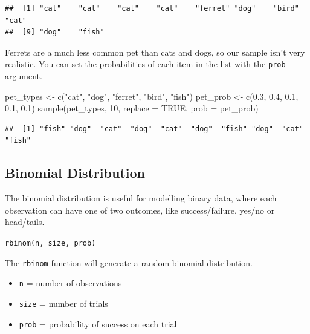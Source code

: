 \documentclass[
  oneside]{book}
\newenvironment{Shaded}{\begin{snugshade}}{\end{snugshade}}
\newcommand{\AttributeTok}[1]{\textcolor[rgb]{0.77,0.63,0.00}{#1}}
\newcommand{\ConstantTok}[1]{\textcolor[rgb]{0.00,0.00,0.00}{#1}}
\newcommand{\DecValTok}[1]{\textcolor[rgb]{0.00,0.00,0.81}{#1}}
\newcommand{\FloatTok}[1]{\textcolor[rgb]{0.00,0.00,0.81}{#1}}
\newcommand{\FunctionTok}[1]{\textcolor[rgb]{0.00,0.00,0.00}{#1}}
\newcommand{\NormalTok}[1]{#1}
\newcommand{\OtherTok}[1]{\textcolor[rgb]{0.56,0.35,0.01}{#1}}
\newcommand{\StringTok}[1]{\textcolor[rgb]{0.31,0.60,0.02}{#1}}
\providecommand{\tightlist}{%
  \setlength{\itemsep}{0pt}\setlength{\parskip}{0pt}}
\begin{document}
\begin{verbatim}
##  [1] "cat"    "cat"    "cat"    "cat"    "ferret" "dog"    "bird"   "cat"   
##  [9] "dog"    "fish"
\end{verbatim}

Ferrets are a much less common pet than cats and dogs, so our sample isn't very realistic. You can set the probabilities of each item in the list with the \texttt{prob} argument.

\begin{Shaded}
\begin{Highlighting}[]
\NormalTok{pet\_types }\OtherTok{\textless{}{-}} \FunctionTok{c}\NormalTok{(}\StringTok{"cat"}\NormalTok{, }\StringTok{"dog"}\NormalTok{, }\StringTok{"ferret"}\NormalTok{, }\StringTok{"bird"}\NormalTok{, }\StringTok{"fish"}\NormalTok{)}
\NormalTok{pet\_prob }\OtherTok{\textless{}{-}} \FunctionTok{c}\NormalTok{(}\FloatTok{0.3}\NormalTok{, }\FloatTok{0.4}\NormalTok{, }\FloatTok{0.1}\NormalTok{, }\FloatTok{0.1}\NormalTok{, }\FloatTok{0.1}\NormalTok{)}
\FunctionTok{sample}\NormalTok{(pet\_types, }\DecValTok{10}\NormalTok{, }\AttributeTok{replace =} \ConstantTok{TRUE}\NormalTok{, }\AttributeTok{prob =}\NormalTok{ pet\_prob)}
\end{Highlighting}
\end{Shaded}

\begin{verbatim}
##  [1] "fish" "dog"  "cat"  "dog"  "cat"  "dog"  "fish" "dog"  "cat"  "fish"
\end{verbatim}

\hypertarget{binomial}{%
\subsection{Binomial Distribution}\label{binomial}}

The binomial distribution is useful for modelling binary data, where each observation can have one of two outcomes, like success/failure, yes/no or head/tails.

\texttt{rbinom(n,\ size,\ prob)}

The \texttt{rbinom} function will generate a random binomial distribution.

\begin{itemize}
\tightlist
\item
  \texttt{n} = number of observations
\item
  \texttt{size} = number of trials
\item
  \texttt{prob} = probability of success on each trial
\end{itemize}
\end{document}
